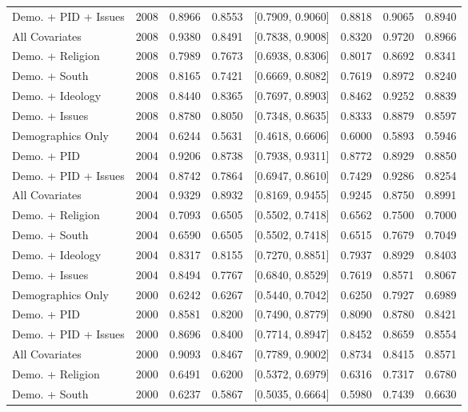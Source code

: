 \begin{longtable}{lrrrlrrr}
  Demo. + PID + Issues & 2008 & 0.8966 & 0.8553 & [0.7909, 0.9060] & 0.8818 & 0.9065 & 0.8940 \\ 
  All Covariates & 2008 & 0.9380 & 0.8491 & [0.7838, 0.9008] & 0.8320 & 0.9720 & 0.8966 \\ 
  Demo. + Religion & 2008 & 0.7989 & 0.7673 & [0.6938, 0.8306] & 0.8017 & 0.8692 & 0.8341 \\ 
  Demo. + South & 2008 & 0.8165 & 0.7421 & [0.6669, 0.8082] & 0.7619 & 0.8972 & 0.8240 \\ 
  Demo. + Ideology & 2008 & 0.8440 & 0.8365 & [0.7697, 0.8903] & 0.8462 & 0.9252 & 0.8839 \\ 
  Demo. + Issues & 2008 & 0.8780 & 0.8050 & [0.7348, 0.8635] & 0.8333 & 0.8879 & 0.8597 \\ 
  Demographics Only & 2004 & 0.6244 & 0.5631 & [0.4618, 0.6606] & 0.6000 & 0.5893 & 0.5946 \\ 
  Demo. + PID & 2004 & 0.9206 & 0.8738 & [0.7938, 0.9311] & 0.8772 & 0.8929 & 0.8850 \\ 
  Demo. + PID + Issues & 2004 & 0.8742 & 0.7864 & [0.6947, 0.8610] & 0.7429 & 0.9286 & 0.8254 \\ 
  All Covariates & 2004 & 0.9329 & 0.8932 & [0.8169, 0.9455] & 0.9245 & 0.8750 & 0.8991 \\ 
  Demo. + Religion & 2004 & 0.7093 & 0.6505 & [0.5502, 0.7418] & 0.6562 & 0.7500 & 0.7000 \\ 
  Demo. + South & 2004 & 0.6590 & 0.6505 & [0.5502, 0.7418] & 0.6515 & 0.7679 & 0.7049 \\ 
  Demo. + Ideology & 2004 & 0.8317 & 0.8155 & [0.7270, 0.8851] & 0.7937 & 0.8929 & 0.8403 \\ 
  Demo. + Issues & 2004 & 0.8494 & 0.7767 & [0.6840, 0.8529] & 0.7619 & 0.8571 & 0.8067 \\ 
  Demographics Only & 2000 & 0.6242 & 0.6267 & [0.5440, 0.7042] & 0.6250 & 0.7927 & 0.6989 \\ 
  Demo. + PID & 2000 & 0.8581 & 0.8200 & [0.7490, 0.8779] & 0.8090 & 0.8780 & 0.8421 \\ 
  Demo. + PID + Issues & 2000 & 0.8696 & 0.8400 & [0.7714, 0.8947] & 0.8452 & 0.8659 & 0.8554 \\ 
  All Covariates & 2000 & 0.9093 & 0.8467 & [0.7789, 0.9002] & 0.8734 & 0.8415 & 0.8571 \\ 
  Demo. + Religion & 2000 & 0.6491 & 0.6200 & [0.5372, 0.6979] & 0.6316 & 0.7317 & 0.6780 \\ 
  Demo. + South & 2000 & 0.6237 & 0.5867 & [0.5035, 0.6664] & 0.5980 & 0.7439 & 0.6630 \\ 

\end{longtable}

